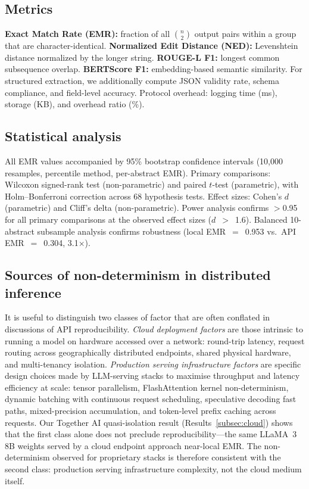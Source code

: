\documentclass[sn-nature]{sn-jnl}
\begin{document}
\subsection{Metrics}\label{subsec:metrics}

\textbf{Exact Match Rate (EMR):} fraction of all $\binom{n}{2}$ output pairs within a group that are character-identical.
\textbf{Normalized Edit Distance (NED):} Levenshtein distance\cite{levenshtein1966binary} normalized by the longer string.
\textbf{ROUGE-L F1:} longest common subsequence overlap\cite{lin2004rouge}.
\textbf{BERTScore F1:} embedding-based semantic similarity\cite{zhang2020bertscore}.
For structured extraction, we additionally compute JSON validity rate, schema compliance, and field-level accuracy.
Protocol overhead: logging time (ms), storage (KB), and overhead ratio (\%).


\subsection{Statistical analysis}\label{subsec:stats}

All EMR values accompanied by 95\% bootstrap confidence intervals (10,000 resamples, percentile method, per-abstract EMR)\cite{efron1993introduction}.
Primary comparisons: Wilcoxon signed-rank test (non-parametric) and paired $t$-test (parametric), with Holm--Bonferroni correction across 68 hypothesis tests.
Effect sizes: Cohen's $d$ (parametric) and Cliff's delta\cite{romano2006appropriate} (non-parametric).
Power analysis confirms $>$0.95 for all primary comparisons at the observed effect sizes ($d$~$>$~1.6)\cite{cohen1988statistical}.
Balanced 10-abstract subsample analysis confirms robustness (local EMR~$=$~0.953 vs.\ API EMR~$=$~0.304, 3.1$\times$).


\subsection{Sources of non-determinism in distributed inference}\label{subsec:sources}

It is useful to distinguish two classes of factor that are often conflated in discussions of API reproducibility.
\emph{Cloud deployment factors} are those intrinsic to running a model on hardware accessed over a network: round-trip latency, request routing across geographically distributed endpoints, shared physical hardware, and multi-tenancy isolation.
\emph{Production serving infrastructure factors} are specific design choices made by LLM-serving stacks to maximise throughput and latency efficiency at scale: tensor parallelism, FlashAttention kernel non-determinism, dynamic batching with continuous request scheduling, speculative decoding fast paths, mixed-precision accumulation, and token-level prefix caching across requests.
Our Together AI quasi-isolation result (Results~\ref{subsec:cloud}) shows that the first class alone does not preclude reproducibility---the same LLaMA~3 8B weights served by a cloud endpoint approach near-local EMR.
The non-determinism observed for proprietary stacks is therefore consistent with the second class: production serving infrastructure complexity, not the cloud medium itself.
\end{document}
